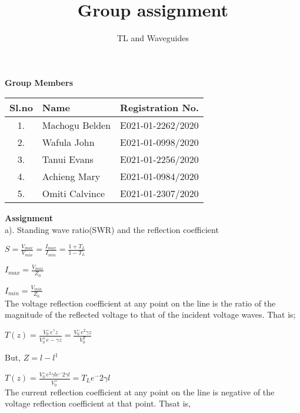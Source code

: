 \documentclass[10pt,a4paper]{report}
\title{Group assignment}
\author{TL and Waveguides}
\begin{document}
\maketitle

\textbf{Group Members}
\begin{table}[h]
\centering
\begin{tabular}{|c|l|l|}
\hline
Sl.no & Name & Registration No. \\\hline
1. & Machogu Belden & E021-01-2262/2020  \\\hline
2. & Wafula John & E021-01-0998/2020 \\\hline
3. & Tanui Evans & E021-01-2256/2020 \\\hline
4. & Achieng Mary & E021-01-0984/2020 \\\hline
5. & Omiti Calvince & E021-01-2307/2020 \\\hline
\end{tabular}
\end{table}

\pagebreak




\textbf{Assignment}\\
a). Standing wave ratio(SWR) and the reflection coefficient

$S=\frac{V_{max}}{V_{min}}=\frac{I_{max}}{I_{min}}=\frac{1+T_{L}}{1-T_{L}}$

$I_{max}=\frac{V_{max}}{Z_{0}}$

$I_{min}=\frac{V_{min}}{Z_{0}}$\\
The voltage reflection coefficient at any point on the line is the ratio of the magnitude of the reflected voltage to that of the incident voltage waves. That is;

$T(z)=\frac{V_{0}^-e^\gamma z}{V_{0}^+e-\gamma z}=\frac{V_{0}^- e^2\gamma z}{V_{0}^T}$

But, $Z=l-l^1$

$T(z)=\frac{V_{0}^- e^2\gamma l e^ -2\gamma l}{V_{0}^+}=T_{L}e^-2\gamma l$\\
The current reflection coefficient at any point on the line is negative of the voltage reflection coefficient at that point. Thsat is,
\end{document}

